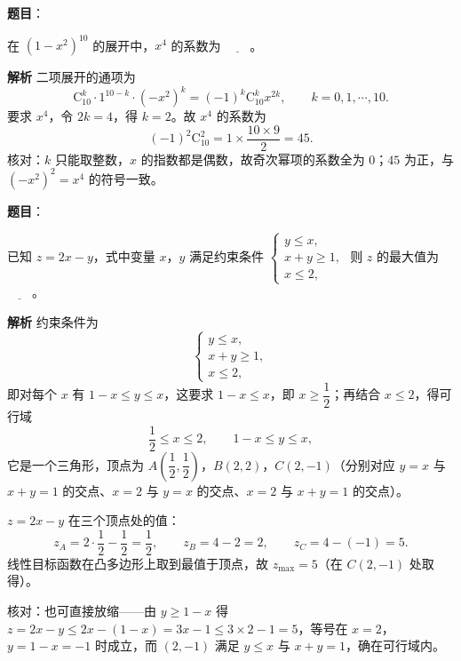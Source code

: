 \begin{answer}

\textbf{题目}：

在 $(1-x^2)^{10}$ 的展开中，$x^4$ 的系数为 $\underline{\qquad}$。

\textbf{解析}
二项展开的通项为
\nopagebreak[4]
\[\mathrm C_{10}^{k}\cdot 1^{10-k}\cdot(-x^2)^{k}=(-1)^{k}\mathrm C_{10}^{k}x^{2k},\qquad k=0,1,\cdots,10.\]
要求 $x^4$，令 $2k=4$，得 $k=2$。故 $x^4$ 的系数为
\nopagebreak[4]
\[(-1)^2\mathrm C_{10}^{2}=1\times\frac{10\times9}{2}=45.\]
核对：$k$ 只能取整数，$x$ 的指数都是偶数，故奇次幂项的系数全为 $0$；$45$ 为正，与 $(-x^2)^2=x^4$ 的符号一致。


\end{answer}
\begin{answer}

\textbf{题目}：

已知 $z=2x-y$，式中变量 $x$，$y$ 满足约束条件 $\begin{cases}y\leqslant x,\\x+y\geqslant1,\\x\leqslant2,\end{cases}$ 则 $z$ 的最大值为 $\underline{\qquad}$。

\textbf{解析}
约束条件为
\nopagebreak[4]
\[\begin{cases}y\leqslant x,\\ x+y\geqslant1,\\ x\leqslant2,\end{cases}\]
即对每个 $x$ 有 $1-x\leqslant y\leqslant x$，这要求 $1-x\leqslant x$，即 $x\geqslant\dfrac12$；再结合 $x\leqslant2$，得可行域
\nopagebreak[4]
\[\frac12\leqslant x\leqslant2,\qquad 1-x\leqslant y\leqslant x,\]
它是一个三角形，顶点为 $A\left(\dfrac12,\dfrac12\right)$，$B(2,2)$，$C(2,-1)$（分别对应 $y=x$ 与 $x+y=1$ 的交点、$x=2$ 与 $y=x$ 的交点、$x=2$ 与 $x+y=1$ 的交点）。

$z=2x-y$ 在三个顶点处的值：
\nopagebreak[4]
\[z_A=2\cdot\frac12-\frac12=\frac12,\qquad z_B=4-2=2,\qquad z_C=4-(-1)=5.\]
线性目标函数在凸多边形上取到最值于顶点，故 $z_{\max}=5$（在 $C(2,-1)$ 处取得）。

核对：也可直接放缩——由 $y\geqslant1-x$ 得 $z=2x-y\leqslant2x-(1-x)=3x-1\leqslant3\times2-1=5$，等号在 $x=2$，$y=1-x=-1$ 时成立，而 $(2,-1)$ 满足 $y\leqslant x$ 与 $x+y=1$，确在可行域内。


\end{answer}
